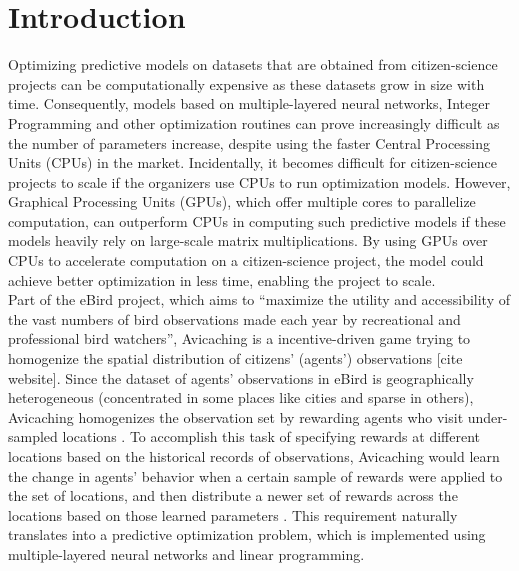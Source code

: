 \documentclass[12pt]{article}
\newcommand{\matr}[1]{\mathbf{#1}}  %
\begin{document}
    \mbox{}
    \nomenclature[S]{$\matr{M}$; $\matr{m}$}{Matrix or vector depending on the context}
    
    \printnomenclature[1.5in]
    \cleardoublepage
    
    \tableofcontents
    \listoftables
    \listoffigures
    
    \section{Introduction} \label{sec:Introduction}
    Optimizing predictive models on datasets that are obtained from citizen-science projects can be computationally expensive as these datasets grow in size with time. Consequently, models based on multiple-layered neural networks, Integer Programming and other optimization routines can prove increasingly difficult as the number of parameters increase, despite using the faster Central Processing Units (CPUs) in the market. Incidentally, it becomes difficult for citizen-science projects to scale if the organizers use CPUs to run optimization models. However, Graphical Processing Units (GPUs), which offer multiple cores to parallelize computation, can outperform CPUs in computing such predictive models if these models heavily rely on large-scale matrix multiplications. By using GPUs over CPUs to accelerate computation on a citizen-science project, the model could achieve better optimization in less time, enabling the project to scale.\\
    
    Part of the eBird project, which aims to ``maximize the utility and accessibility of the vast numbers of bird observations made each year by recreational and professional bird watchers'', Avicaching is a incentive-driven game trying to homogenize the spatial distribution of citizens' (agents') observations [cite website]. Since the dataset of agents' observations in eBird is geographically heterogeneous (concentrated in some places like cities and sparse in others), Avicaching homogenizes the observation set by rewarding agents who visit under-sampled locations \cite{Xue2016Avi1}. To accomplish this task of specifying rewards at different locations based on the historical records of observations, Avicaching would learn the change in agents' behavior when a certain sample of rewards were applied to the set of locations, and then distribute a newer set of rewards across the locations based on those learned parameters \cite{Xue2016Avi2}. This requirement naturally translates into a predictive optimization problem, which is implemented using multiple-layered neural networks and linear programming.
\end{document}
